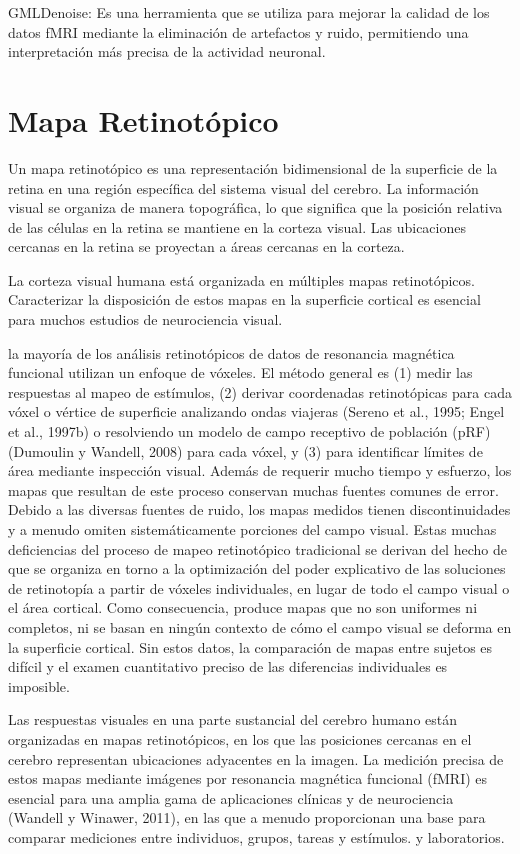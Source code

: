 GMLDenoise: Es una herramienta que se utiliza para mejorar la calidad de los datos fMRI mediante la eliminación de artefactos y ruido, permitiendo una interpretación más precisa de la actividad neuronal.

\section{Mapa Retinot\'opico}
Un mapa retinotópico es una representación bidimensional de la superficie de la retina en una región específica del sistema visual del cerebro. La información visual se organiza de manera topográfica, lo que significa que la posición relativa de las células en la retina se mantiene en la corteza visual. Las ubicaciones cercanas en la retina se proyectan a áreas cercanas en la corteza.

La corteza visual humana está organizada en múltiples mapas retinotópicos. Caracterizar la disposición de estos mapas en la superficie cortical es esencial para muchos estudios de neurociencia visual.

la mayoría de los análisis retinotópicos de datos de resonancia magnética funcional utilizan un enfoque de vóxeles. El método general es (1) medir las respuestas al mapeo de estímulos, (2) derivar coordenadas retinotópicas para cada vóxel o vértice de superficie analizando ondas viajeras (Sereno et al., 1995; Engel et al., 1997b) o resolviendo un modelo de campo receptivo de población (pRF) (Dumoulin y Wandell, 2008) para cada vóxel, y (3) para identificar límites de área mediante inspección visual. Además de requerir mucho tiempo y esfuerzo, los mapas que resultan de este proceso conservan muchas fuentes comunes de error. Debido a las diversas fuentes de ruido, los mapas medidos tienen discontinuidades y a menudo omiten sistemáticamente porciones del campo visual. Estas muchas deficiencias del proceso de mapeo retinotópico tradicional se derivan del hecho de que se organiza en torno a la optimización del poder explicativo de las soluciones de retinotopía a partir de vóxeles individuales, en lugar de todo el campo visual o el área cortical. Como consecuencia, produce mapas que no son uniformes ni completos, ni se basan en ningún contexto de cómo el campo visual se deforma en la superficie cortical. Sin estos datos, la comparación de mapas entre sujetos es difícil y el examen cuantitativo preciso de las diferencias individuales es imposible.

Las respuestas visuales en una parte sustancial del cerebro humano están organizadas en mapas retinotópicos, en los que las posiciones cercanas en el cerebro representan ubicaciones adyacentes en la imagen. La medición precisa de estos mapas mediante imágenes por resonancia magnética funcional (fMRI) es esencial para una amplia gama de aplicaciones clínicas y de neurociencia (Wandell y Winawer, 2011), en las que a menudo proporcionan una base para comparar mediciones entre individuos, grupos, tareas y estímulos. y laboratorios. 

